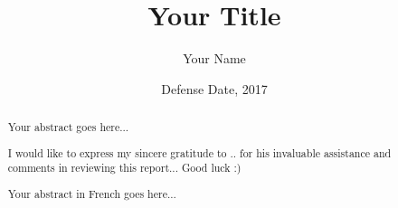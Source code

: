 \documentclass[12pt, a4paper]{memoir} %
\title{Your Title} %
\author{Your Name}
\date{Defense Date, 2017} %
\begin{document}
\frontmatter
\begin{titlingpage}
\maketitle
\end{titlingpage}

\setlength{\parskip}{-1pt plus 1pt}

\renewcommand{\abstracttextfont}{\normalfont}
\abstractintoc
\begin{abstract}
Your abstract goes here...
\end{abstract}
\abstractintoc

\renewcommand\abstractname{Acknowledgement}
\begin{abstract}
I would like to express my sincere gratitude to .. for his invaluable assistance and comments in reviewing this report...
Good luck :)
\end{abstract}


\renewcommand\abstractname{R\'esum\'e}
\begin{abstract} 
Your abstract in French goes here...
\end{abstract}

\cleardoublepage

\tableofcontents* %
\normalsize

\mainmatter
\SingleSpace






\backmatter



\end{document}
